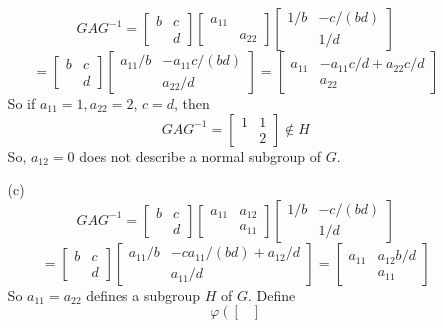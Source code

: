 \documentclass[12pt]{article}
\begin{document}
\begin{itemize}
\begin{itemize}
$$GAG^{-1} = \begin{bmatrix}
b & c \\
& d
\end{bmatrix}\begin{bmatrix}
a_{11} & \\
& a_{22}
\end{bmatrix}\begin{bmatrix}
1/b & -c/(bd) \\
& 1/d
\end{bmatrix}$$
$$= \begin{bmatrix}
b & c \\
& d
\end{bmatrix}\begin{bmatrix}
a_{11}/b & -a_{11}c/(bd) \\
& a_{22}/d
\end{bmatrix} = \begin{bmatrix}
a_{11} & -a_{11}c/d + a_{22}c/d \\
& a_{22}
\end{bmatrix}$$
So if $a_{11} = 1, a_{22} = 2$, $c = d$, then
$$GAG^{-1} = \begin{bmatrix}
1 & 1 \\
& 2
\end{bmatrix} \not \in H$$
So, $a_{12} = 0$ does not describe a normal subgroup of $G$.
\item[(c)]
$$GAG^{-1} = \begin{bmatrix}
b & c \\
& d
\end{bmatrix}\begin{bmatrix}
a_{11} & a_{12} \\
& a_{11}
\end{bmatrix}\begin{bmatrix}
1/b & -c/(bd) \\
& 1/d
\end{bmatrix}$$
$$= \begin{bmatrix}
b & c \\
& d
\end{bmatrix}\begin{bmatrix}
a_{11}/b & -ca_{11}/(bd) + a_{12}/d \\
& a_{11}/d
\end{bmatrix} = \begin{bmatrix}
a_{11} & a_{12}b/d \\
& a_{11}
\end{bmatrix}$$
So $a_{11} = a_{22}$ defines a subgroup $H$ of $G$. Define
$$\varphi\left( \begin{bmatrix}

\end{bmatrix}$$
\end{itemize}
\end{itemize}
\end{document}
